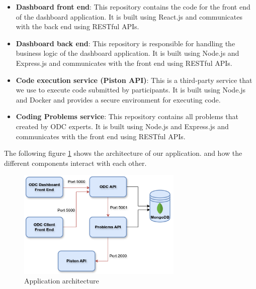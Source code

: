 \begin{itemize}
      \item \textbf{Dashboard front end}: This repository contains the code for the
            front end of the dashboard application. It is built using React.js and
            communicates with the back end using RESTful APIs.

      \item \textbf{Dashboard back end}: This repository is responsible for handling the
            business logic of the dashboard application. It is built using Node.js
            and Express.js and communicates with the front end using RESTful APIs.

      \item \textbf{Code execution service (Piston API)}: This is a third-party service
            that we use to execute code submitted by participants. It is built
            using Node.js and Docker and provides a secure environment for
            executing code.

      \item \textbf{Coding Problems service}: This repository contains all problems that created
            by ODC experts. It is built using Node.js and Express.js and communicates with
            the front end using RESTful APIs.
\end{itemize}


The following figure \ref{fig:architecture} shows the architecture of our application.
and how the different components interact with each other.

\begin{figure}[h!]
      \centering
      \includegraphics[width=0.7\textwidth]{images/applicationArchitecture.png}
      \caption{Application architecture}
      \label{fig:architecture}
\end{figure}